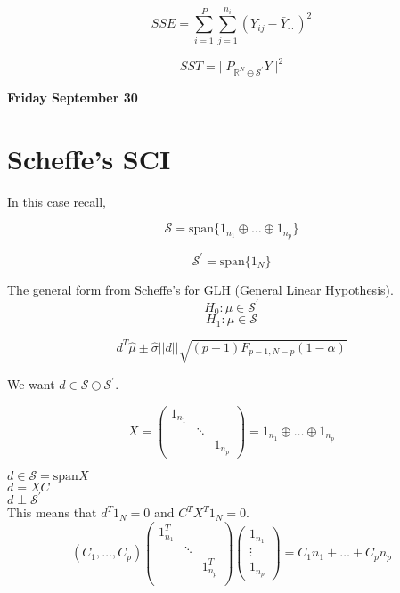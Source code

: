 \documentclass[11pt,fleqn]{book} %
\begin{document}
 		$$SSE =  \displaystyle \sum^P_{i = 1} \sum^{n_i}_{j=1} (Y_{ij} - \bar{Y}_{\cdot \cdot})^2$$

 		$$SST = ||P_{\mathbb{R}^N \ominus \mathcal{S}^\prime} Y ||^2  $$

 	
\textbf{Friday September 30}\\

\section{Scheffe's SCI}


In this case recall, 

		$$\mathcal{S} = \text{span}\{1_{n_1} \oplus \dots \oplus 1_{n_p} \}$$

		$$\mathcal{S}^\prime = \text{span}\{1_N \} $$

The general form from Scheffe's for GLH (General Linear Hypothesis).\\

		$$H_0: \mu \in \mathcal{S}^\prime $$
		$$H_1: \mu \in \mathcal{S} $$

		$$d^T \hat{\mu} \pm \hat{\sigma} ||d|| \sqrt{(p - 1) F_{p-1, N-p} (1 - \alpha)} $$

We want $d \in \mathcal{S} \ominus \mathcal{S}^\prime$. 

		$$X = \begin{pmatrix}
			1_{n_1} & & \\
			& \ddots & \\
			& & 1_{n_p}
		\end{pmatrix} = 1_{n_1} \oplus \dots \oplus 1_{n_p} $$

$d \in \mathcal{S} = \text{span}X$\\
$d = XC$\\
$d \perp \mathcal{S}^\prime$\\

This means that $d^T1_N = 0$ and $C^TX^T 1_N = 0 $.\\

		$$\left(C_1, \dots, C_p \right) \begin{pmatrix}
			1^T_{n_1} & & \\
			& \ddots & \\
			& & 1^T_{n_p}\\
		\end{pmatrix} \begin{pmatrix}
			1_{n_1}\\
			\vdots\\
			1_{n_p}
		\end{pmatrix} = C_1 n_1 + \dots + C_p n_p$$
\end{document}
